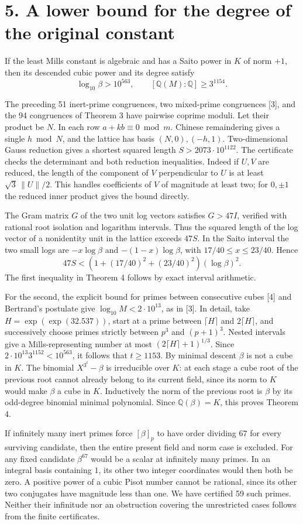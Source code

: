 \documentclass[11pt,a4paper,oneside,openany]{book}
\newcommand{\Q}{\mathbb Q}\newcommand{\C}{\mathbb C}\newcommand{\Z}{\mathbb Z}\newcommand{\F}{\mathbb F}\newcommand{\Tr}{\operatorname{Tr}}\newcommand{\Nm}{\operatorname{N}}\newcommand{\ord}{\operatorname{ord}}\newcommand{\K}{K}\newcommand{\OO}{\mathcal O_K}\newcommand{\unit}{\mathcal U}
\newcommand{\localhead}[1]{\needspace{5\baselineskip}\section*{\color{ink}#1}}
\let\sect\localhead\let\secx\localhead\let\head\localhead
\begin{document}
\sect{5. A lower bound for the degree of the original constant}
 If the least Mills constant is algebraic and has a Saito power in $K$ of norm $+1$, then its descended cubic power and its degree satisfy
\[
       \log_{10}\beta>10^{563},\qquad [\Q(M):\Q]\ge3^{1154}.
\]

The preceding 51 inert-prime congruences, two mixed-prime congruences [3], and the 94 congruences of Theorem 3 have pairwise coprime moduli. Let their product be $N$. In each row $a+kb\equiv0\bmod m$. Chinese remaindering gives a single $h\bmod N$, and the lattice has basis $(N,0),(-h,1)$. Two-dimensional Gauss reduction gives a shortest squared length $S>2073\cdot10^{1122}$. The certificate checks the determinant and both reduction inequalities. Indeed if $U,V$ are reduced, the length of the component of $V$ perpendicular to $U$ is at least $\sqrt3\,\lVert U\rVert/2$. This handles coefficients of $V$ of magnitude at least two; for $0,\pm1$ the reduced inner product gives the bound directly.

The Gram matrix $G$ of the two unit log vectors satisfies $G>47I$, verified with rational root isolation and logarithm intervals. Thus the squared length of the log vector of a nonidentity unit in the lattice exceeds $47S$. In the Saito interval the two small logs are $-x\log\beta$ and $-(1-x)\log\beta$, with $17/40\le x\le23/40$. Hence
\[
 47S < \left(1+(17/40)^2+(23/40)^2\right)(\log\beta)^2 .
\]
The first inequality in Theorem 4 follows by exact interval arithmetic.

For the second, the explicit bound for primes between consecutive cubes [4] and Bertrand's postulate give $\log_{10}M<2\cdot10^{13}$, as in [3]. In detail, take $H=\exp(\exp(32.537))$, start at a prime between $\lceil H\rceil$ and $2\lceil H\rceil$, and successively choose primes strictly between $p^3$ and $(p+1)^3$. Nested intervals give a Mills-representing number at most $(2\lceil H\rceil+1)^{1/3}$. Since $2\cdot10^{13}3^{1152}<10^{563}$, it follows that $t\ge1153$. By minimal descent $\beta$ is not a cube in $K$. The binomial $X^{3^t}-\beta$ is irreducible over $K$: at each stage a cube root of the previous root cannot already belong to its current field, since its norm to $K$ would make $\beta$ a cube in $K$. Inductively the norm of the previous root is $\beta$ by its odd-degree binomial minimal polynomial. Since $\Q(\beta)=K$, this proves Theorem 4.

 If infinitely many inert primes force $[\beta]_p$ to have order dividing $67$ for every surviving candidate, then the entire present field and norm case is excluded. For any fixed candidate $\beta^{67}$ would be a scalar at infinitely many primes. In an integral basis containing $1$, its other two integer coordinates would then both be zero. A positive power of a cubic Pisot number cannot be rational, since its other two conjugates have magnitude less than one. We have certified 59 such primes. Neither their infinitude nor an obstruction covering the unrestricted cases follows from the finite certificates.
\end{document}
